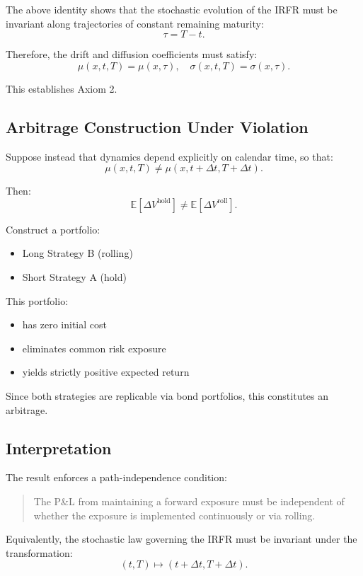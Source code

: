 \documentclass[12pt]{article}
\theoremstyle{statementstyle}
\begin{document}
\begin{appendices}
The above identity shows that the stochastic evolution of the IRFR must be invariant along trajectories of constant remaining maturity:
\[
\tau = T - t.
\]

Therefore, the drift and diffusion coefficients must satisfy:
\[
\mu(x,t,T) = \mu(x, \tau), \quad \sigma(x,t,T) = \sigma(x, \tau).
\]

This establishes Axiom 2.

\subsection{Arbitrage Construction Under Violation}
\label{D.6)}

Suppose instead that dynamics depend explicitly on calendar time, so that:
\[
\mu(x,t,T) \neq \mu(x,t+\Delta t, T+\Delta t).
\]

Then:
\[
\mathbb{E}[\Delta V^{\text{hold}}] \neq \mathbb{E}[\Delta V^{\text{roll}}].
\]

Construct a portfolio:
\begin{itemize}
\item Long Strategy B (rolling)
\item Short Strategy A (hold)
\end{itemize}

This portfolio:
\begin{itemize}
\item has zero initial cost
\item eliminates common risk exposure
\item yields strictly positive expected return
\end{itemize}

Since both strategies are replicable via bond portfolios, this constitutes an arbitrage.

\subsection{Interpretation}
\label{D.7}

The result enforces a path-independence condition:
\begin{quote}
The P\&L from maintaining a forward exposure must be independent of whether the exposure is implemented continuously or via rolling.
\end{quote}

Equivalently, the stochastic law governing the IRFR must be invariant under the transformation:
\[
(t, T) \mapsto (t + \Delta t, T + \Delta t).
\]


\end{appendices}
\end{document}
